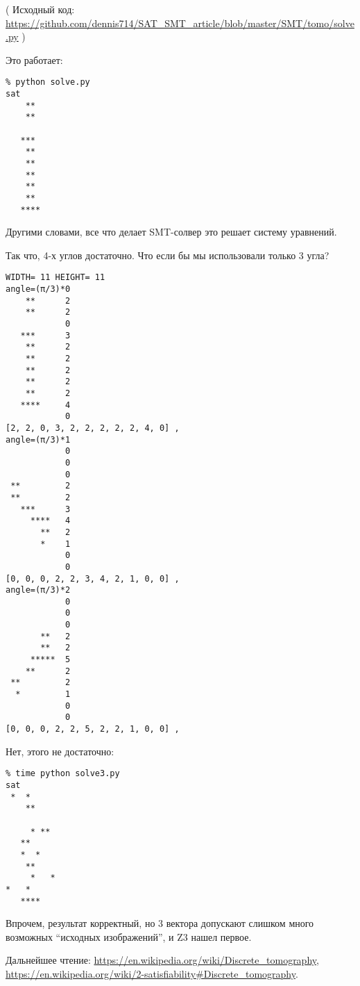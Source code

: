 ( Исходный код: \url{https://github.com/dennis714/SAT_SMT_article/blob/master/SMT/tomo/solve.py} )

Это работает:

\begin{lstlisting}
% python solve.py
sat
    **
    **

   ***
    **
    **
    **
    **
    **
   ****
\end{lstlisting}

Другими словами, все что делает SMT-солвер это решает систему уравнений.

Так что, 4-х углов достаточно.
Что если бы мы использовали только 3 угла?

\begin{lstlisting}
WIDTH= 11 HEIGHT= 11
angle=(π/3)*0
    **      2
    **      2
            0
   ***      3
    **      2
    **      2
    **      2
    **      2
    **      2
   ****     4
            0
[2, 2, 0, 3, 2, 2, 2, 2, 2, 4, 0] ,
angle=(π/3)*1
            0
            0
            0
 **         2
 **         2
   ***      3
     ****   4
       **   2
       *    1
            0
            0
[0, 0, 0, 2, 2, 3, 4, 2, 1, 0, 0] ,
angle=(π/3)*2
            0
            0
            0
       **   2
       **   2
     *****  5
    **      2
 **         2
  *         1
            0
            0
[0, 0, 0, 2, 2, 5, 2, 2, 1, 0, 0] ,
\end{lstlisting}

Нет, этого не достаточно:

\begin{lstlisting}
% time python solve3.py
sat
 *  *
    **

     * **
   **
   *  *
    **
     *   *
*   *
   ****
\end{lstlisting}

Впрочем, результат корректный, но 3 вектора допускают слишком много возможных ``исходных изображений'', и Z3 нашел
первое.

Дальнейшее чтение:
\url{https://en.wikipedia.org/wiki/Discrete_tomography},
\url{https://en.wikipedia.org/wiki/2-satisfiability#Discrete_tomography}.

